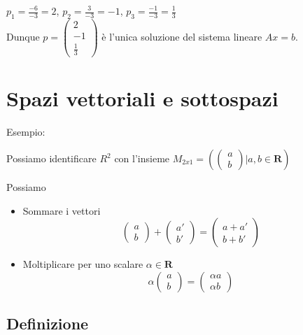 \documentclass[12pt]{article}
\begin{document}
\begin{center}
    $p_1 = \frac{-6}{-3} = 2$, $p_2 = \frac{3}{-3} = -1$, $p_3 = \frac{-1}{-3} = \frac{1}{3}$\\
    Dunque $p = \begin{pmatrix}
        2\\
        -1\\
        \frac{1}{3}
    \end{pmatrix}$ è l'unica soluzione del sistema lineare $Ax = b$.
\end{center}

\pagebreak

\section{Spazi vettoriali e sottospazi}

Esempio:

\begin{center}
    Possiamo identificare $R^2$ con l'insieme $M_{2x1} = \left(\begin{pmatrix}
        a\\
        b
    \end{pmatrix} | a, b \in \mathbf{R}\right) $
\end{center}
Possiamo
\begin{itemize}
    \item Sommare i vettori
    \[\begin{pmatrix}
        a\\
        b
    \end{pmatrix} + \begin{pmatrix}
        a'\\
        b'
    \end{pmatrix} = \begin{pmatrix}
        a+a'\\
        b+b'
    \end{pmatrix}\]
    \item Moltiplicare per uno scalare $\alpha \in \mathbf{R}$
    \[\alpha \begin{pmatrix}
        a\\
        b
    \end{pmatrix} = \begin{pmatrix}
        \alpha a\\
        \alpha b
    \end{pmatrix}\]
\end{itemize}

\subsection{Definizione}
\end{document}

